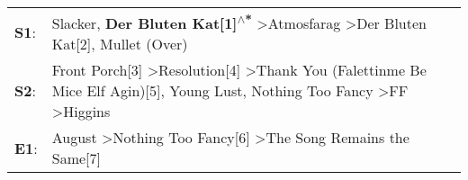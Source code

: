 \begin{supertabular}{p{0.03\textwidth}p{0.92\textwidth}}
 \textbf{S1}:  &                                                                                                           Slacker\textsuperscript{}, \enspace \textbf{Der Bluten Kat[1]\textsuperscript{$\wedge$*}} \textgreater \enspace Atmosfarag\textsuperscript{} \textgreater \enspace Der Bluten Kat[2]\textsuperscript{}, \enspace Mullet (Over)\textsuperscript{}  \enspace  \\
 \textbf{S2}:  &  Front Porch[3]\textsuperscript{} \textgreater \enspace Resolution[4]\textsuperscript{} \textgreater \enspace Thank You (Falettinme Be Mice Elf Agin)[5]\textsuperscript{}, \enspace Young Lust\textsuperscript{}, \enspace Nothing Too Fancy\textsuperscript{} \textgreater \enspace FF\textsuperscript{} \textgreater \enspace Higgins\textsuperscript{}  \enspace  \\
 \textbf{E1}:  &                                                                                                                                                                                                 August\textsuperscript{} \textgreater \enspace Nothing Too Fancy[6]\textsuperscript{} \textgreater \enspace The Song Remains the Same[7]\textsuperscript{}  \enspace  \\
\end{supertabular}
